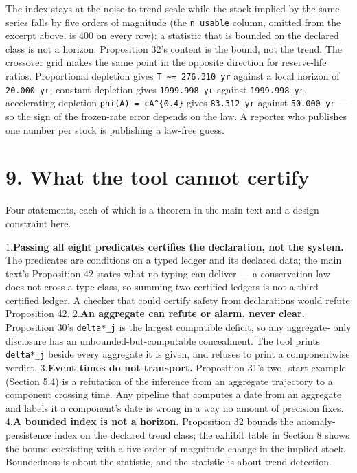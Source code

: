 \documentclass[11pt]{article}
\begin{document}
The index stays at the noise-to-trend scale while the stock implied by the same series falls by five orders of magnitude (the \texttt{n usable} column, omitted from the excerpt above, is 400 on every row): a statistic that is bounded on the declared class is not a horizon. Proposition 32's content is the bound, not the trend. The crossover grid makes the same point in the opposite direction for reserve-life ratios. Proportional depletion gives \texttt{T \textasciitilde{}= 276.\allowbreak{}310 yr} against a local horizon of \texttt{20.\allowbreak{}000 yr}, constant depletion gives \texttt{1999.\allowbreak{}998 yr} against \texttt{1999.\allowbreak{}998 yr}, accelerating depletion \texttt{phi(A) = cA\textasciicircum\allowbreak{}{}\{0.\allowbreak{}4\}} gives \texttt{83.\allowbreak{}312 yr} against \texttt{50.\allowbreak{}000 yr} --- so the sign of the frozen-rate error depends on the law. A reporter who publishes one number per stock is publishing a law-free guess.

\vspace{0.8em}

\section*{9. What the tool cannot certify}\label{9-what-the-tool-cannot-certify}

Four statements, each of which is a theorem in the main text and a design constraint here.

1.\textbf{Passing all eight predicates certifies the declaration, not the system.} The predicates are conditions on a typed ledger and its declared data; the main text's Proposition 42 states what no typing can deliver --- a conservation law does not cross a type class, so summing two certified ledgers is not a third certified ledger. A checker that could certify safety from declarations would refute Proposition 42. 2.\textbf{An aggregate can refute or alarm, never clear.} Proposition 30's \texttt{delta*\_j} is the largest compatible deficit, so any aggregate- only disclosure has an unbounded-but-computable concealment. The tool prints \texttt{delta*\_j} beside every aggregate it is given, and refuses to print a componentwise verdict. 3.\textbf{Event times do not transport.} Proposition 31's two- start example (Section 5.4) is a refutation of the inference from an aggregate trajectory to a component crossing time. Any pipeline that computes a date from an aggregate and labels it a component's date is wrong in a way no amount of precision fixes. 4.\textbf{A bounded index is not a horizon.} Proposition 32 bounds the anomaly-persistence index on the declared trend class; the exhibit table in Section 8 shows the bound coexisting with a five-order-of-magnitude change in the implied stock. Boundedness is about the statistic, and the statistic is about trend detection.
\end{document}
